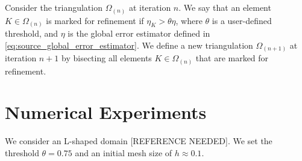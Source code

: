 \documentclass[12pt]{amsart}
\begin{document}
Consider the triangulation \(\Omega_{(n)}\) at iteration \(n\).
We say that an element \(K \in \Omega_{(n)}\) is marked for refinement if \(\eta_K > \theta \eta\), where \(\theta\) is a user-defined threshold, and \(\eta\) is the global error estimator defined in \eqref{eq:source_global_error_estimator}.
We define a new triangulation \(\Omega_{(n+1)}\) at iteration \(n+1\) by bisecting all elements \(K \in \Omega_{(n)}\) that are marked for refinement.

\section{Numerical Experiments}

We consider an L-shaped domain [REFERENCE NEEDED].
We set the threshold \(\theta = 0.75\) and an initial mesh size of \(h \approx 0.1\).
\end{document}
